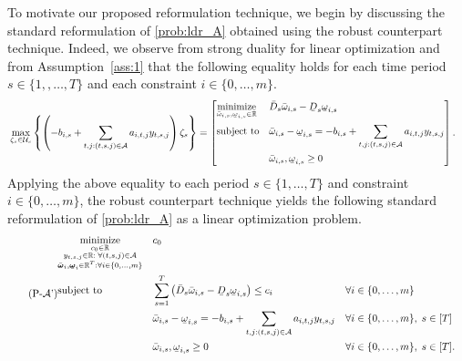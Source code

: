 \documentclass[nonblindrev,mnsc]{informs3} %
\newcommand{\bomega}{{\boldsymbol{\omega}}}
\def\Real{\mathbb{R}}
\let\R\Real
\newcommand{\ubar}[1]{\text{\b{$#1$}}}
\begin{document}
To motivate our proposed reformulation technique, we begin by discussing the standard reformulation of \eqref{prob:ldr_A} obtained using the robust counterpart technique. 
 Indeed, we observe from strong duality for linear optimization and from Assumption~\ref{ass:1} that the following equality holds for each time period $s \in \{1,,\ldots,T\}$ and  each constraint $i \in \{0,\ldots,m\}$.
 \begin{align*}
&\max_{\zeta_s \in \mathcal{U}_s} \left \{ \left( - b_{i,s} + \sum_{t,j: (t,s,j) \in \mathcal{A}} a_{i,t,j} y_{t,s,j} \right) \zeta_s \right \} = \left[ \begin{aligned}
    &\underset{\bar{\omega}_{i,s},\ubar{\omega}_{i,s} \in \R}{\text{minimize}}&& \bar{D}_s  \bar{\omega}_{i,s}  - \ubar{D}_s \ubar{\omega}_{i,s}  \\
    &\textnormal{subject to}&& \bar{\omega}_{i,s} - \ubar{\omega}_{i,s} =  -b_{i,s} + \sum_{t,j: (t,s,j) \in \mathcal{A}}  a_{i,t,j}  y_{t,s,j} \\
        &&& \bar{\omega}_{i,s}, \ubar{\omega}_{i,s} \ge 0 
    \end{aligned} \right]. 
\end{align*}
Applying the above equality to each period $s \in \{1,\ldots,T\}$ and  constraint $i \in \{0,\ldots,m\}$, the robust counterpart technique yields the  following standard reformulation of \eqref{prob:ldr_A} as a linear optimization problem.
\begin{equation}   \tag{P-$\mathcal{A}$'}\label{prob:P_A_1}
\begin{aligned}
&\underset{\substack{c_0 \in \R\\y_{t,s,j} \in \R :\;  \forall (t,s,j) \in \mathcal{A}\\ \bar{\bomega}_i, \ubar{\bomega}_i \in \R^T: \forall i \in \{0,\ldots,m\}}}{\textnormal{minimize}}&& c_0 \\%
&\textnormal{subject to}&&\sum_{s =1}^T \left(  \bar{D}_s  \bar{\omega}_{i,s}  - \ubar{D}_s \ubar{\omega}_{i,s} \right) \le c_i  && \forall i \in \{0,\ldots,m\} \\
    &&& \bar{\omega}_{i,s} - \ubar{\omega}_{i,s} =  -b_{i,s} + \sum_{t,j: (t,s,j) \in \mathcal{A}}  a_{i,t,j}  y_{t,s,j}  && \forall i \in  \{0,\ldots,m  \}, \;s \in [T] \\
    &&&  \bar{\omega}_{i,s}, \ubar{\omega}_{i,s} \ge 0 && \forall i \in \{0,\ldots,m\}, \; s \in [T].
\end{aligned}
\end{equation}
\end{document}
